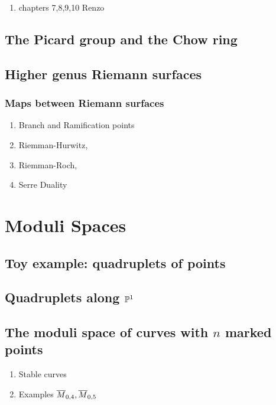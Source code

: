 \documentclass[12pt]{memoir}
\begin{document}
\begin{enumerate}
    \item chapters 7,8,9,10 Renzo
\end{enumerate}

\section{The Picard group and the Chow ring}

\section{Higher genus Riemann surfaces}

\subsection{Maps between Riemann surfaces}

\begin{enumerate}
    \item Branch and Ramification points
    \item Riemman-Hurwitz,
    \item Riemman-Roch,
    \item Serre Duality
\end{enumerate}

\chapter{Moduli Spaces}

\section{Toy example: quadruplets of points}

\section{Quadruplets along $\mathbb{P}^1$}

\section{The moduli space of curves with $n$ marked points}

\begin{enumerate}
    \item Stable curves
    \item Examples $\overline{M}_{0,4}, \overline{M}_{0,5}$ 
\end{enumerate}
\end{document}
